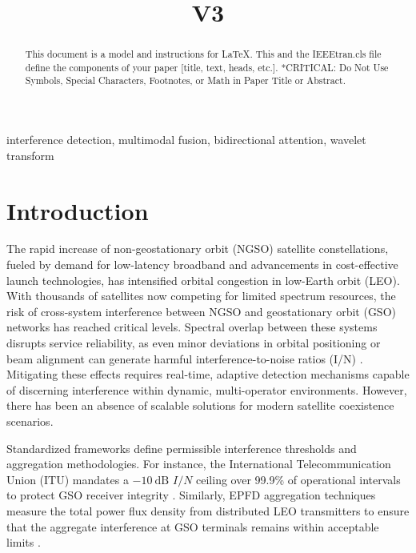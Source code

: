 \documentclass[10pt, conference]{IEEEtran}
\begin{document}
\title{V3}

\author{
}

\maketitle

\begin{abstract}
    This document is a model and instructions for \LaTeX.
    This and the IEEEtran.cls file define the components of your paper [title, text, heads, etc.]. *CRITICAL: Do Not Use Symbols, Special Characters, Footnotes,
    or Math in Paper Title or Abstract.
\end{abstract}

\begin{IEEEkeywords}
    interference detection, multimodal fusion, bidirectional attention, wavelet transform
\end{IEEEkeywords}

\section{Introduction}

The rapid increase of non-geostationary orbit (NGSO) satellite constellations, fueled by demand for low-latency broadband and advancements in cost-effective launch technologies, has intensified orbital congestion in low-Earth orbit (LEO). With thousands of satellites now competing for limited spectrum resources, the risk of cross-system interference between NGSO and geostationary orbit (GSO) networks has reached critical levels. Spectral overlap between these systems disrupts service reliability, as even minor deviations in orbital positioning or beam alignment can generate harmful interference-to-noise ratios (I/N) \cite{itu2020}. Mitigating these effects requires real-time, adaptive detection mechanisms capable of discerning interference within dynamic, multi-operator environments. However, there has been an absence of scalable solutions for modern satellite coexistence scenarios.

Standardized frameworks define permissible interference thresholds and aggregation methodologies. For instance, the International Telecommunication Union (ITU) mandates a $-10~\text{dB}$ $I / N$ ceiling over 99.9\% of operational intervals to protect GSO receiver integrity \cite{itur2017ProtectionCriteriaOperation}. Similarly, EPFD aggregation techniques measure the total power flux density from distributed LEO transmitters to ensure that the aggregate interference at GSO terminals remains within acceptable limits \cite{itur2002AggregateDownlinkEquivalent}.
\end{document}
